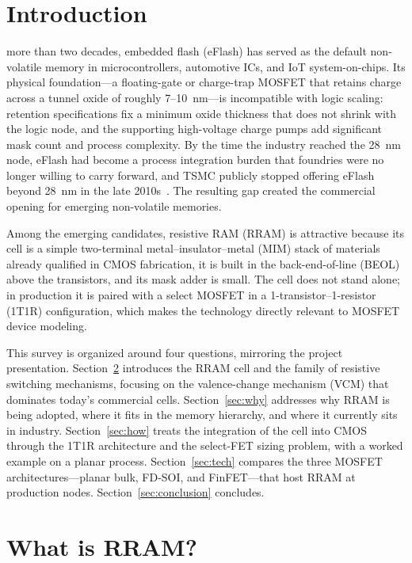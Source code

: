 \documentclass[lettersize,journal]{IEEEtran}
\begin{document}
\section{Introduction}
 more than two decades, embedded flash (eFlash) has served as the default non-volatile memory in microcontrollers, automotive ICs, and IoT system-on-chips. Its physical foundation---a floating-gate or charge-trap MOSFET that retains charge across a tunnel oxide of roughly 7--10~nm---is incompatible with logic scaling: retention specifications fix a minimum oxide thickness that does not shrink with the logic node, and the supporting high-voltage charge pumps add significant mask count and process complexity. By the time the industry reached the 28~nm node, eFlash had become a process integration burden that foundries were no longer willing to carry forward, and TSMC publicly stopped offering eFlash beyond 28~nm in the late 2010s~\cite{ref_hellenbrand2024}. The resulting gap created the commercial opening for emerging non-volatile memories.

Among the emerging candidates, resistive RAM (RRAM) is attractive because its cell is a simple two-terminal metal--insulator--metal (MIM) stack of materials already qualified in CMOS fabrication, it is built in the back-end-of-line (BEOL) above the transistors, and its mask adder is small. The cell does not stand alone; in production it is paired with a select MOSFET in a 1-transistor--1-resistor (1T1R) configuration, which makes the technology directly relevant to MOSFET device modeling.

This survey is organized around four questions, mirroring the project presentation. Section~\ref{sec:what} introduces the RRAM cell and the family of resistive switching mechanisms, focusing on the valence-change mechanism (VCM) that dominates today's commercial cells. Section~\ref{sec:why} addresses why RRAM is being adopted, where it fits in the memory hierarchy, and where it currently sits in industry. Section~\ref{sec:how} treats the integration of the cell into CMOS through the 1T1R architecture and the select-FET sizing problem, with a worked example on a planar process. Section~\ref{sec:tech} compares the three MOSFET architectures---planar bulk, FD-SOI, and FinFET---that host RRAM at production nodes. Section~\ref{sec:conclusion} concludes.

\section{What is RRAM?}\label{sec:what}
\end{document}
